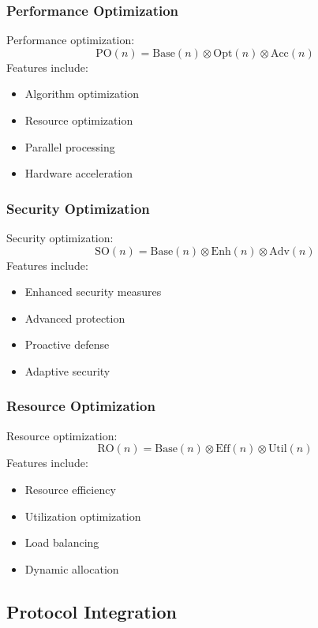 \documentclass[12pt]{article}
\begin{document}
\subsubsection{Performance Optimization}
Performance optimization:
\begin{equation}
\text{PO}(n) = \text{Base}(n) \otimes \text{Opt}(n) \otimes \text{Acc}(n)
\end{equation}
Features include:
\begin{itemize}
\item Algorithm optimization
\item Resource optimization
\item Parallel processing
\item Hardware acceleration
\end{itemize}
\subsubsection{Security Optimization}
Security optimization:
\begin{equation}
\text{SO}(n) = \text{Base}(n) \otimes \text{Enh}(n) \otimes \text{Adv}(n)
\end{equation}
Features include:
\begin{itemize}
\item Enhanced security measures
\item Advanced protection
\item Proactive defense
\item Adaptive security
\end{itemize}
\subsubsection{Resource Optimization}
Resource optimization:
\begin{equation}
\text{RO}(n) = \text{Base}(n) \otimes \text{Eff}(n) \otimes \text{Util}(n)
\end{equation}
Features include:
\begin{itemize}
\item Resource efficiency
\item Utilization optimization
\item Load balancing
\item Dynamic allocation
\end{itemize}
\subsection{Protocol Integration}
\end{document}

